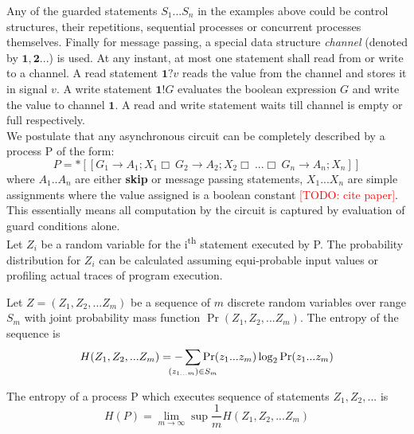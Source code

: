 Any of the guarded statements $S_1... S_n$ in the examples above could be 
control structures, their repetitions, sequential processes or concurrent processes themselves. 
Finally for message passing, a special data structure \emph{channel} (denoted
by $\mathbf{1}, \mathbf{2}...$) is used. 
At any instant, at most one statement shall read from or write to a channel.
A read statement $\mathbf{1} ? v$ reads the value from the channel and stores
it in signal $v$. A write statement $\mathbf{1} ! G$ evaluates the boolean
expression $G$ and write the value to channel $\mathbf{1}$. A read and write
statement waits till channel is empty or full respectively.
\\

We postulate that any asynchronous circuit can be completely described 
by a process P of the form:
\begin{equation} \label{eq:basic_csp}
	P = *[[ G_1 \to A_1; X_1 \Box\ G_2 \to A_2; X_2 \Box\ ... \Box\ G_n \to
	A_n; X_n ]]
\end{equation}
where $A_1.. A_n$ are either \textbf{skip} or message passing
statements, $X_1... X_n$ are simple assignments where the value assigned is a
boolean constant \textcolor{red}{[TODO: cite paper]}.
This essentially means all computation by the circuit is captured by
evaluation of guard conditions alone.
\\

Let $Z_i$ be a random variable for the i\textsuperscript{th} statement executed by P. 
The probability distribution for $Z_i$ can be
calculated assuming equi-probable input values or profiling actual traces of
program execution.
\\

\begin{defn}[Entropy]
	Let $Z = (Z_1, Z_2, ... Z_m)$ be a sequence of $m$ discrete random variables over
	range $S_m$ with joint probability mass function $\Pr(Z_1, Z_2, ... Z_m)$. 
	The entropy of the sequence is 
	\begin{equation}
		H(Z_1, Z_2, ... Z_m) = - \sum_{\mathclap{(z_{1...m}) \in S_m}} 
				\Pr(z_1 ... z_m) \log_2{\Pr(z_1... z_m)}
	\end{equation}
\end{defn}
\begin{defn}
	The entropy of a process P which executes sequence of statements $Z_1, Z_2, ...$ is 
	\begin{equation}
		H(P) = \lim_{m \to \infty}{ \sup \frac{1}{m} H(Z_1, Z_2, ... Z_m)}
	\end{equation}
\end{defn}

